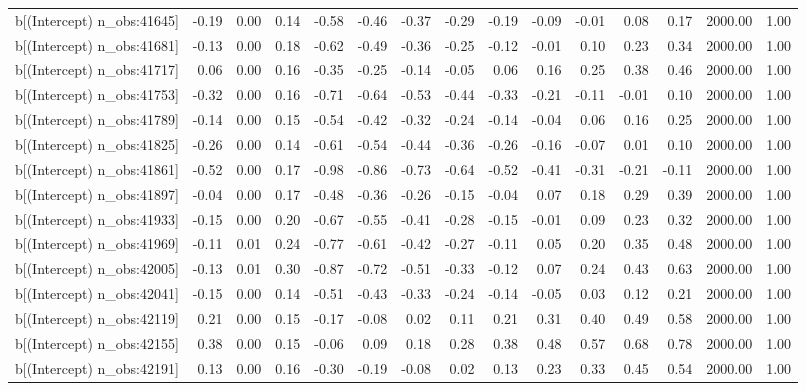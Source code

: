 \begin{table}[ht]
\begin{tabular}{rrrrrrrrrrrrrrr}
  b[(Intercept) n\_obs:41645] & -0.19 & 0.00 & 0.14 & -0.58 & -0.46 & -0.37 & -0.29 & -0.19 & -0.09 & -0.01 & 0.08 & 0.17 & 2000.00 & 1.00 \\ 
  b[(Intercept) n\_obs:41681] & -0.13 & 0.00 & 0.18 & -0.62 & -0.49 & -0.36 & -0.25 & -0.12 & -0.01 & 0.10 & 0.23 & 0.34 & 2000.00 & 1.00 \\ 
  b[(Intercept) n\_obs:41717] & 0.06 & 0.00 & 0.16 & -0.35 & -0.25 & -0.14 & -0.05 & 0.06 & 0.16 & 0.25 & 0.38 & 0.46 & 2000.00 & 1.00 \\ 
  b[(Intercept) n\_obs:41753] & -0.32 & 0.00 & 0.16 & -0.71 & -0.64 & -0.53 & -0.44 & -0.33 & -0.21 & -0.11 & -0.01 & 0.10 & 2000.00 & 1.00 \\ 
  b[(Intercept) n\_obs:41789] & -0.14 & 0.00 & 0.15 & -0.54 & -0.42 & -0.32 & -0.24 & -0.14 & -0.04 & 0.06 & 0.16 & 0.25 & 2000.00 & 1.00 \\ 
  b[(Intercept) n\_obs:41825] & -0.26 & 0.00 & 0.14 & -0.61 & -0.54 & -0.44 & -0.36 & -0.26 & -0.16 & -0.07 & 0.01 & 0.10 & 2000.00 & 1.00 \\ 
  b[(Intercept) n\_obs:41861] & -0.52 & 0.00 & 0.17 & -0.98 & -0.86 & -0.73 & -0.64 & -0.52 & -0.41 & -0.31 & -0.21 & -0.11 & 2000.00 & 1.00 \\ 
  b[(Intercept) n\_obs:41897] & -0.04 & 0.00 & 0.17 & -0.48 & -0.36 & -0.26 & -0.15 & -0.04 & 0.07 & 0.18 & 0.29 & 0.39 & 2000.00 & 1.00 \\ 
  b[(Intercept) n\_obs:41933] & -0.15 & 0.00 & 0.20 & -0.67 & -0.55 & -0.41 & -0.28 & -0.15 & -0.01 & 0.09 & 0.23 & 0.32 & 2000.00 & 1.00 \\ 
  b[(Intercept) n\_obs:41969] & -0.11 & 0.01 & 0.24 & -0.77 & -0.61 & -0.42 & -0.27 & -0.11 & 0.05 & 0.20 & 0.35 & 0.48 & 2000.00 & 1.00 \\ 
  b[(Intercept) n\_obs:42005] & -0.13 & 0.01 & 0.30 & -0.87 & -0.72 & -0.51 & -0.33 & -0.12 & 0.07 & 0.24 & 0.43 & 0.63 & 2000.00 & 1.00 \\ 
  b[(Intercept) n\_obs:42041] & -0.15 & 0.00 & 0.14 & -0.51 & -0.43 & -0.33 & -0.24 & -0.14 & -0.05 & 0.03 & 0.12 & 0.21 & 2000.00 & 1.00 \\ 
  b[(Intercept) n\_obs:42119] & 0.21 & 0.00 & 0.15 & -0.17 & -0.08 & 0.02 & 0.11 & 0.21 & 0.31 & 0.40 & 0.49 & 0.58 & 2000.00 & 1.00 \\ 
  b[(Intercept) n\_obs:42155] & 0.38 & 0.00 & 0.15 & -0.06 & 0.09 & 0.18 & 0.28 & 0.38 & 0.48 & 0.57 & 0.68 & 0.78 & 2000.00 & 1.00 \\ 
  b[(Intercept) n\_obs:42191] & 0.13 & 0.00 & 0.16 & -0.30 & -0.19 & -0.08 & 0.02 & 0.13 & 0.23 & 0.33 & 0.45 & 0.54 & 2000.00 & 1.00 \\ 

\end{tabular}
\end{table}
